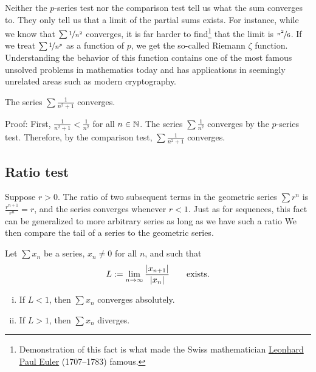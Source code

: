 Neither the $p$-series test nor the comparison test 
tell us what the sum converges to.  They only tell us that a limit
of the partial sums exists.  For instance, while we know that
$\sum \nicefrac{1}{n^2}$ converges, it is far harder to
find\footnote{Demonstration of this fact is
what made the Swiss mathematician
\href{https://en.wikipedia.org/wiki/Leonhard_Euler}{Leonhard Paul Euler}
(1707--1783)
famous.}
that the limit is $\nicefrac{\pi^2}{6}$.
If we treat $\sum \nicefrac{1}{n^p}$ as a function of $p$,
we get the so-called Riemann $\zeta$ function.  Understanding the
behavior of this function contains
one of the most famous unsolved problems in mathematics today and has applications
in seemingly unrelated areas such as modern cryptography.

\begin{example}
The series $\sum \frac{1}{n^2+1}$ converges.

Proof:  First, $\frac{1}{n^2+1} < \frac{1}{n^2}$ for all $n \in {\mathbb{N}}$.
The series $\sum \frac{1}{n^2}$ converges by the $p$-series test.
Therefore, by the comparison test, $\sum \frac{1}{n^2+1}$ converges.
\end{example}

\subsection{Ratio test}

Suppose $r > 0$.  The ratio of two subsequent terms in the geometric series $\sum
r^n$ is $\frac{r^{n+1}}{r^n} = r$, and the series converges
whenever $r < 1$.  Just as for sequences, this fact
can be generalized to more arbitrary series
as long as we have such a ratio   We then compare
the tail of a series to the geometric series.


\begin{prop}
Let $\sum x_n$ be a series, $x_n \not= 0$ for all $n$, and such that
\begin{equation*}
L := \lim_{n\to\infty} \frac{\left\lvert {x_{n+1}} \right\rvert}{\left\lvert {x_n} \right\rvert}
\qquad \text{exists.}
\end{equation*}
\begin{enumerate}[(i)]
\item
If $L < 1$, then $\sum x_n$ converges absolutely.
\item
If $L > 1$, then $\sum x_n$ diverges.
\end{enumerate}
\end{prop}

